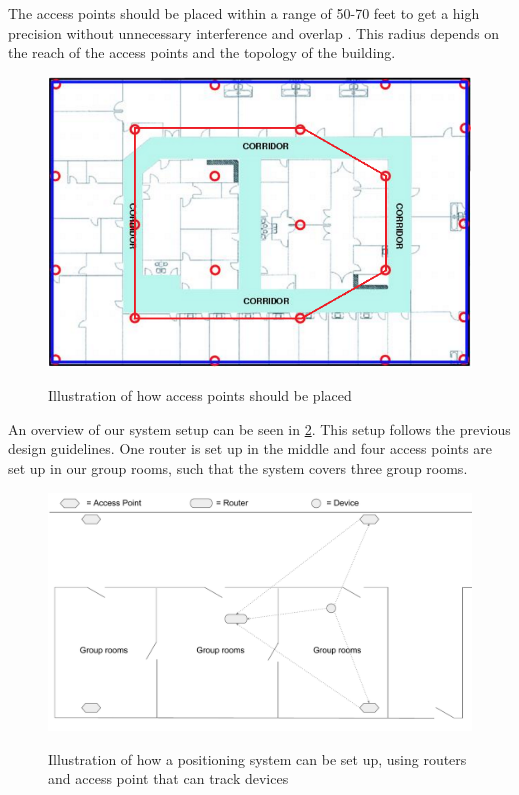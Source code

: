 The access points should be placed within a range of 50-70 feet to get a high precision without unnecessary interference and overlap \cite{access_point_range}. This radius depends on the reach of the access points and the topology of the building.

\begin{figure}[H]
	\centering
	\includegraphics[scale=0.5]{graphics/access_placement.png}
	\label{fig:access_placement}
	\caption{Illustration of how access points should be placed \cite{access_point_placement}}
\end{figure}

An overview of our system setup can be seen in \cref{fig:OwnSetup}. This setup follows the previous design guidelines. One router is set up in the middle and four access points are set up in our group rooms, such that the system covers three group rooms.

\begin{figure}[H]
	\centering
	\includegraphics[scale=0.5]{graphics/Router-AccessPoint_Setup.pdf}
	\label{fig:OwnSetup}
	\caption{Illustration of how a positioning system can be set up, using routers and access point that can track devices}
\end{figure}

